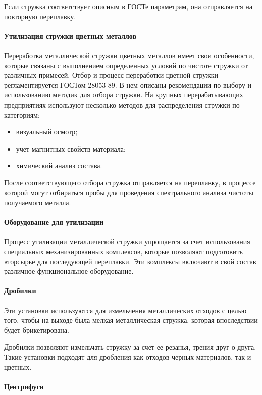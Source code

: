 Если стружка соответствует описным в ГОСТе параметрам, она отправляется на повторную переплавку.

\paragraph{Утилизация стружки цветных металлов}

Переработка металлической стружки цветных металлов имеет свои особенности, которые связаны с выполнением определенных условий по чистоте стружки от различных примесей. Отбор и процесс переработки цветной стружки регламентируется ГОСТом 28053-89. В нем описаны рекомендации по выбору и использованию методик для отбора стружки.
На крупных перерабатывающих предприятиях используют несколько методов для распределения стружки по категориям:
\begin{itemize}
	\item визуальный осмотр;
	\item учет магнитных свойств материала;
	\item химический анализ состава.
\end{itemize}
После соответствующего отбора стружка отправляется на переплавку, в процессе которой могут отбираться пробы для проведения спектрального анализа чистоты получаемого металла.

\paragraph{Оборудование для утилизации}

Процесс утилизации металлической стружки упрощается за счет использования специальных механизированных комплексов, которые позволяют подготовить вторсырье для последующей переплавки. Эти комплексы включают в свой состав различное функциональное оборудование.

\paragraph{Дробилки}

Эти установки используются для измельчения металлических отходов с целью того, чтобы на выходе была мелкая металлическая стружка, которая впоследствии будет брикетирована.

Дробилки позволяют измельчать стружку за счет ее резанья, трения друг о друга. Такие установки подходят для дробления как отходов черных материалов, так и цветных.

\paragraph{Центрифуги}

